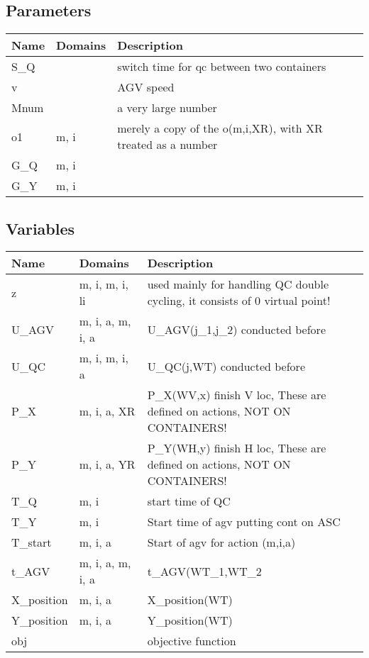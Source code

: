 \documentclass[11pt]{article}
\begin{document}
\subsection*{Parameters}
\begin{tabularx}{\textwidth}{| l | l | X |} 
\hline 
\textbf{Name} & \textbf{Domains} & \textbf{Description}\\ 
\hline 
\endhead 
S\_Q &  & switch time for qc between two containers \\ 
v &  & AGV speed \\ 
Mnum &  & a very large number \\ 
o1 & m, i & merely a copy of the o(m,i,XR), with XR treated as a number \\ 
G\_Q & m, i &  \\ 
G\_Y & m, i &  \\ 
\hline 
\end{tabularx}
\subsection*{Variables}
\begin{tabularx}{\textwidth}{| l | l | X |} 
\hline 
\textbf{Name} & \textbf{Domains} & \textbf{Description}\\ 
\hline 
\endhead 
z & m, i, m, i, li & used mainly for handling QC double cycling, it consists of 0 virtual point! \\ 
U\_AGV & m, i, a, m, i, a & U\_AGV(j\_1,j\_2) conducted before \\ 
U\_QC & m, i, m, i, a & U\_QC(j,WT) conducted before \\ 
P\_X & m, i, a, XR & P\_X(WV,x) finish V loc, These are defined on actions, NOT ON CONTAINERS! \\ 
P\_Y & m, i, a, YR & P\_Y(WH,y) finish H loc, These are defined on actions, NOT ON CONTAINERS! \\ 
T\_Q & m, i & start time of QC \\ 
T\_Y & m, i & Start time of agv putting cont on ASC \\ 
T\_start & m, i, a & Start of agv for action (m,i,a) \\ 
t\_AGV & m, i, a, m, i, a & t\_AGV(WT\_1,WT\_2 \\ 
X\_position & m, i, a & X\_position(WT) \\ 
Y\_position & m, i, a & Y\_position(WT) \\ 
obj &  & objective function \\ 
\hline 
\end{tabularx}
\end{document}
